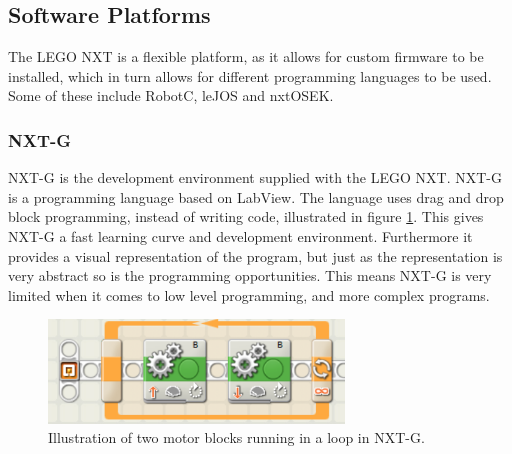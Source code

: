 \subsection{Software Platforms}
The LEGO NXT is a flexible platform, as it allows for custom firmware to be installed, which in turn allows for different programming languages to be used.
Some of these include RobotC\cite{RobotC}, leJOS\cite{leJOS} and nxtOSEK\cite{nxtOSEK}.

\subsubsection{NXT-G}
NXT-G is the development environment supplied with the LEGO NXT. NXT-G is a programming language based on LabView\cite{LabView}. The language uses drag and drop block programming, instead of writing code, illustrated in figure \ref{NXT-G}. This gives NXT-G a fast learning curve and development environment. Furthermore it provides a visual representation of the program, but just as the representation is very abstract so is the programming opportunities. This means NXT-G is very limited when it comes to low level programming, and more complex programs.



\begin{figure}[H]
    \centering
    \includegraphics[width=0.7\textwidth]{Images/Software/Mindstorms/mindstorms_block.png}
    \caption{Illustration of two motor blocks running in a loop in NXT-G.}
    \label{NXT-G}
\end{figure}


